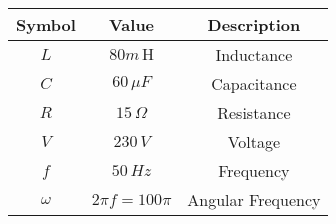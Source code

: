 \begin{tabular}{|c|c|c|}
	\hline
	\textbf{Symbol} & \textbf{Value} &
	\textbf{Description}\\[6pt]
	\hline
	$L$ &  $80m\,
	\text{H}$ & Inductance\\[6pt]
	\hline 
	$C$ &  $60\, \mu F$ & Capacitance \\[6pt]
	\hline
	$R$ &  $15\, \Omega$ & Resistance\\[6pt]
	\hline
	$V$ & $230\, V$ & Voltage\\[6pt]
	\hline
	$f$ & $50\, {Hz}$ & Frequency\\[6pt]
	\hline
	$\omega$ & $2\pi f=100\pi$ & Angular Frequency\\[6pt]
	\hline
\end{tabular}